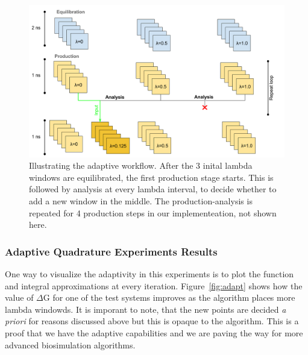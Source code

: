 \begin{figure}
  \centering
   \includegraphics[width=\columnwidth]{figures/Adaptive_TIES_1.png}
  \caption{Illustrating the adaptive workflow. After the 3 inital lambda windows are equilibrated, the first production stage starts. This is followed by analysis at every lambda interval, to decide whether to add a new window in the middle. The production-analysis is repeated for 4 production steps in our implementeation, not shown here.}
\label{fig:adaptive_TIES}
\end{figure}

\subsubsection{Adaptive Quadrature Experiments Results}

One way to visualize the adaptivity in this experiments is to plot the function
and integral approximations at every iteration. Figure~\ref{fig:adapt} shows
how the value of $\Delta$G for one of the test systems improves as the
algorithm places more lambda windowds. It is imporant to note, that the new
points are decided {\it a priori} for reasons discussed above but this is
opaque to the algorithm. This is a proof that we have the adaptive capabilities
and we are paving the way for more advanced biosimulation algorithms.

